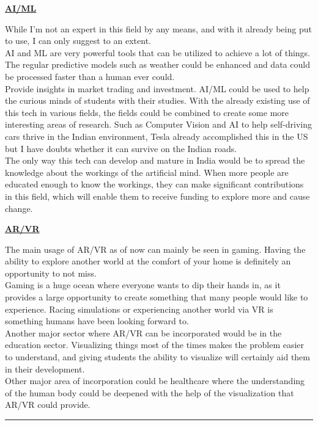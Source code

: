\documentclass[a4paper]{article}
\begin{document}
\begin{center}
    \textbf{\underline{AI/ML}}
\end{center}

While I'm not an expert in this field by any means, and with it already being put to use, I can only suggest to an extent.
\\AI and ML are very powerful tools that can be utilized to achieve a lot of things. The regular predictive models such as weather could be enhanced and data could be processed faster than a human ever could.
\\Provide insights in market trading and investment. AI/ML could be used to help the curious minds of students with their studies. With the already existing use of this tech in various fields, the fields could be combined to create some more interesting areas of research. Such as Computer Vision and AI to help self-driving cars thrive in the Indian environment, Tesla already accomplished this in the US but I have doubts whether it can survive on the Indian roads.
\\The only way this tech can develop and mature in India would be to spread the knowledge about the workings of the artificial mind. When more people are educated enough to know the workings, they can make significant contributions in this field, which will enable them to receive funding to explore more and cause change.

\begin{center}
    \textbf{\underline{AR/VR}}
\end{center}

The main usage of AR/VR as of now can mainly be seen in gaming. Having the ability to explore another world at the comfort of your home is definitely an opportunity to not miss.
\\Gaming is a huge ocean where everyone wants to dip their hands in, as it provides a large opportunity to create something that many people would like to experience. Racing simulations or experiencing another world via VR is something humans have been looking forward to.
\\Another major sector where AR/VR can be incorporated would be in the education sector. Visualizing things most of the times makes the problem easier to understand, and giving students the ability to visualize will certainly aid them in their development.
\\Other major area of incorporation could be healthcare where the understanding of the human body could be deepened with the help of the visualization that AR/VR could provide.

\rule{\textwidth}{0.4pt}

\newpage



\end{document}
